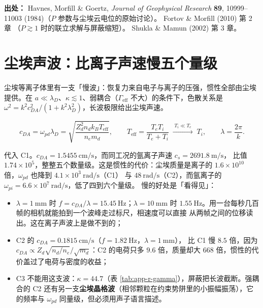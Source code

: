 {\footnotesize
\textbf{出处：} Havnes, Morfill \& Goertz, \emph{Journal of Geophysical Research} \textbf{89},
10999--11003 (1984)（$P$ 参数与尘埃云电位的原始讨论）。
Fortov \& Morfill (2010) 第 2 章
（$P\gtrsim1$ 时的联立求解与屏蔽缩短）。
Shukla \& Mamun (2002) 第 3 章。
}

\section{尘埃声波：比离子声速慢五个量级}
\label{sec:app-r-wave}

尘埃等离子体里有一支「慢波」：恢复力来自电子与离子的压强，惯性全部由尘埃提供。在
$a\ll\lambda_D$、$\kappa\lesssim1$、弱耦合（$\Gamma_{\mathrm{eff}}$ 不大）的条件下，色散关系是
$\omega^{2}=k^{2}c_{DA}^{2}/(1+k^{2}\lambda_D^{2})$，长波极限给出尘埃声速。

\begin{equation}
  c_{DA} = \omega_{pd}\lambda_D
  = \sqrt{\frac{Z_d^{2}n_d k_{\!B}T_{\mathrm{eff}}}{n_e m_d}},
  \qquad
  T_{\mathrm{eff}} = \frac{T_eT_i}{T_e+T_i}
  \;\xrightarrow{\;T_i\ll T_e\;}\; T_i,
  \qquad
  \lambda = \frac{2\pi}{k}.
  \label{eq:app-r-cda}
\end{equation}

代入 C1。$c_{DA}=1.5455\ \mathrm{cm/s}$，而同工况的氩离子声速 $c_s=2691.8\ \mathrm{m/s}$，
比值 $1.74\times10^{5}$，整整五个数量级。这是惯性的代价：尘埃质量是离子的
$1.6\times10^{10}$ 倍，$\omega_{pd}$ 也降到 $4.1\times10^{3}\ \mathrm{rad/s}$（C1）
与 $48\ \mathrm{rad/s}$（C2），而氩离子的 $\omega_{pi}=6.6\times10^{7}\ \mathrm{rad/s}$，低了四到六个量级。
慢的好处是「看得见」：

\begin{itemize}
  \item $\lambda=1\ \mathrm{mm}$ 时 $f=c_{DA}/\lambda=15.45\ \mathrm{Hz}$；$\lambda=10\ \mathrm{mm}$
        时 $1.55\ \mathrm{Hz}$。用一台每秒几百帧的相机就能拍到一个波峰走过标尺，相速度可以直接
        从两帧之间的位移读出。这在离子声波上是做不到的；
  \item C2 的 $c_{DA}=0.1815\ \mathrm{cm/s}$（$f=1.82\ \mathrm{Hz}$，$\lambda=1\ \mathrm{mm}$），
        比 C1 慢 $8.5$ 倍，因为 $c_{DA}\propto Z_d\sqrt{n_d/n_e}/\sqrt{m_d}$：C2 的电荷只多
        $9.6$ 倍，质量却大 $668$ 倍，惯性的代价盖过了电荷与密度的收益；
  \item C3 不能用这支波：$\kappa=44.7$（表 \ref{tab:app-r-gamma}），屏蔽把长波截断。强耦合的
        C2 还有另一支\textbf{尘埃晶格波}（相邻颗粒在约束势阱里的小振幅振荡），它的频率与
        $\omega_{pd}$ 同量级，但必须用声子语言描述。
\end{itemize}

